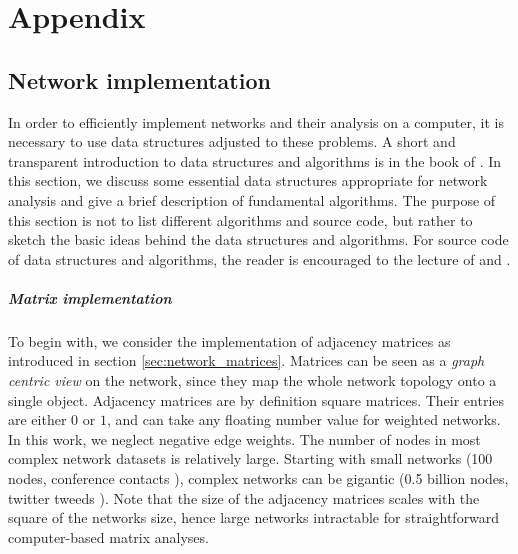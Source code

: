 %
%
%
%
%
%
%

\chapter{Appendix}

\section{Network implementation}\label{sec:implementation}
In order to efficiently implement networks and their analysis on a computer, it is necessary to use data structures adjusted to these problems.
A short and transparent introduction to data structures and algorithms is in the book of \citeauthor{algorithm_design} \citep{algorithm_design}.
In this section, we discuss some essential data structures appropriate for network analysis and give a brief description of fundamental algorithms.
The purpose of this section is not to list different algorithms and source code, but rather to sketch the basic ideas behind the data structures and algorithms.
For source code of data structures and algorithms, the reader is encouraged to the lecture of \citep{algorithm_design} and \citep{Merali:2010ih}.

\paragraph{Matrix implementation\color{Cayenne}{.}}
To begin with, we consider the implementation of adjacency matrices as introduced in section \ref{sec:network_matrices}.
Matrices can be seen as a \emph{graph centric view} on the network, since they map the whole network topology onto a single object.
Adjacency matrices are by definition square matrices.
Their entries are either $0$ or $1$, and can take any floating number value for weighted networks.
In this work, we neglect negative edge weights.
The number of nodes in most complex network datasets is relatively large. 
Starting with small networks (100 nodes, conference contacts \citep{isella2011}), complex networks can be gigantic (0.5 billion nodes, twitter tweeds \citep{Yang:2011}).
Note that the size of the adjacency matrices scales with the square of the networks size, hence large networks intractable for straightforward computer-based matrix analyses.

